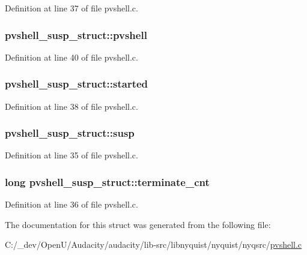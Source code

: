 Definition at line 37 of file pvshell.\+c.

\subsubsection[{\texorpdfstring{pvshell}{pvshell}}]{ pvshell\+\_\+susp\+\_\+struct\+::pvshell}\hypertarget{structpvshell__susp__struct_ae778b93e3dd87839934123039cf1e7ab}{}\label{structpvshell__susp__struct_ae778b93e3dd87839934123039cf1e7ab}


Definition at line 40 of file pvshell.\+c.

\subsubsection[{\texorpdfstring{started}{started}}]{ pvshell\+\_\+susp\+\_\+struct\+::started}\hypertarget{structpvshell__susp__struct_a6621d211a3d9aa94d87af5b1067400c4}{}\label{structpvshell__susp__struct_a6621d211a3d9aa94d87af5b1067400c4}


Definition at line 38 of file pvshell.\+c.

\subsubsection[{\texorpdfstring{susp}{susp}}]{ pvshell\+\_\+susp\+\_\+struct\+::susp}\hypertarget{structpvshell__susp__struct_a2cf1ad10ce8f5582909f3c4cda32ccaa}{}\label{structpvshell__susp__struct_a2cf1ad10ce8f5582909f3c4cda32ccaa}


Definition at line 35 of file pvshell.\+c.

\subsubsection[{\texorpdfstring{terminate\+\_\+cnt}{terminate_cnt}}]{\setlength{\rightskip}{0pt plus 5cm}long pvshell\+\_\+susp\+\_\+struct\+::terminate\+\_\+cnt}\hypertarget{structpvshell__susp__struct_a3d7bdd738c051e884f5dc85ff5d9f416}{}\label{structpvshell__susp__struct_a3d7bdd738c051e884f5dc85ff5d9f416}


Definition at line 36 of file pvshell.\+c.



The documentation for this struct was generated from the following file\+:\begin{DoxyCompactItemize}
\item 
C\+:/\+\_\+dev/\+Open\+U/\+Audacity/audacity/lib-\/src/libnyquist/nyquist/nyqsrc/\hyperlink{pvshell_8c}{pvshell.\+c}\end{DoxyCompactItemize}
